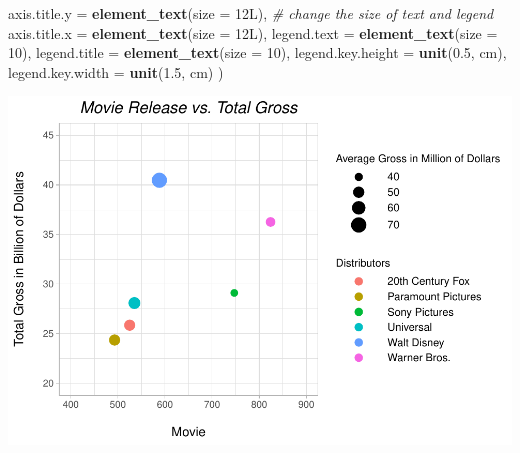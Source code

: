 \documentclass[
]{article}
\newenvironment{Shaded}{\begin{snugshade}}{\end{snugshade}}
\newcommand{\AttributeTok}[1]{\textcolor[rgb]{0.13,0.29,0.53}{#1}}
\newcommand{\CommentTok}[1]{\textcolor[rgb]{0.56,0.35,0.01}{\textit{#1}}}
\newcommand{\DecValTok}[1]{\textcolor[rgb]{0.00,0.00,0.81}{#1}}
\newcommand{\FloatTok}[1]{\textcolor[rgb]{0.00,0.00,0.81}{#1}}
\newcommand{\FunctionTok}[1]{\textcolor[rgb]{0.13,0.29,0.53}{\textbf{#1}}}
\newcommand{\NormalTok}[1]{#1}
\newcommand{\StringTok}[1]{\textcolor[rgb]{0.31,0.60,0.02}{#1}}
\begin{document}
\begin{Shaded}
\begin{Highlighting}[]
    \AttributeTok{axis.title.y =} \FunctionTok{element\_text}\NormalTok{(}\AttributeTok{size =}\NormalTok{ 12L),   }\CommentTok{\# change the size of text and legend }
    \AttributeTok{axis.title.x =} \FunctionTok{element\_text}\NormalTok{(}\AttributeTok{size =}\NormalTok{ 12L),}
    \AttributeTok{legend.text =} \FunctionTok{element\_text}\NormalTok{(}\AttributeTok{size =} \DecValTok{10}\NormalTok{), }
    \AttributeTok{legend.title =} \FunctionTok{element\_text}\NormalTok{(}\AttributeTok{size =} \DecValTok{10}\NormalTok{),}
    \AttributeTok{legend.key.height =} \FunctionTok{unit}\NormalTok{(}\FloatTok{0.5}\NormalTok{, }\StringTok{\textquotesingle{}cm\textquotesingle{}}\NormalTok{),}
    \AttributeTok{legend.key.width =} \FunctionTok{unit}\NormalTok{(}\FloatTok{1.5}\NormalTok{, }\StringTok{\textquotesingle{}cm\textquotesingle{}}\NormalTok{)}
\NormalTok{  )}
\end{Highlighting}
\end{Shaded}

\includegraphics{Final-project_files/figure-latex/unnamed-chunk-3-1.pdf}
\end{document}
